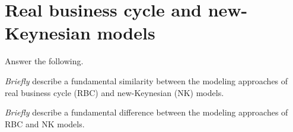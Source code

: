 
\section{Real business cycle and new-Keynesian models} Answer the following.
	
	\EN
	 \emph{Briefly} describe a fundamental similarity between the modeling approaches of real business cycle (RBC) and new-Keynesian (NK) models.
	
	 \emph{Briefly} describe a fundamental difference between the modeling approaches of RBC and NK models.
	\NE
